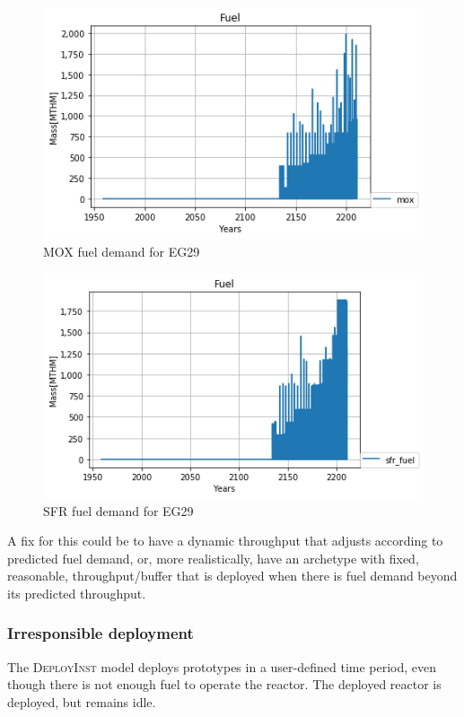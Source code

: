 \documentclass{article}
\begin{document}
\begin{figure}[htbp!]
	\begin{center}
		\includegraphics[scale=0.6]{./images/mox_fuel.png}
	\end{center}
	\caption{\gls{MOX} fuel demand for EG29}
	\label{fig:mox}
\end{figure}
\begin{figure}[htbp!]
	\begin{center}
		\includegraphics[scale=0.6]{./images/sfr_fuel.png}
	\end{center}
	\caption{\gls{SFR} fuel demand for EG29}
	\label{fig:sfr}
\end{figure}
\FloatBarrier

A fix for this could be to have a dynamic throughput that adjusts according
to predicted fuel demand, or, more realistically, have an archetype with fixed, reasonable, throughput/buffer
that is deployed when there is fuel demand beyond its predicted throughput.

\subsubsection{Irresponsible deployment}
The \textsc{DeployInst}\xspace model deploys prototypes in a user-defined time period, even though there is not 
enough fuel to operate the reactor. The deployed reactor is deployed, but remains idle. 
\end{document}
